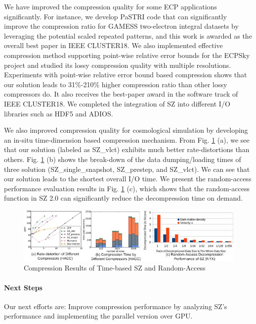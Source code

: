 We have improved the compression quality for some ECP applications significantly. For instance, we develop PaSTRI code that can significantly improve the compression ratio for GAMESS two-electron integral datasets by leveraging the potential scaled repeated patterns, and this work is awarded as the overall best paper in IEEE CLUSTER18. We also implemented effective compression method supporting point-wise relative error bounds for the ECPSky project and studied its lossy compression quality with multiple resolutions. Experiments with point-wise relative error bound based compression shows that our solution leads to 31\%-210\% higher compression ratio than other lossy compressors do. It also receives the best-paper award in the software track of IEEE CLUSTER18. We completed the integration of SZ into different I/O libraries such as HDF5 and ADIOS. 

We also improved compression quality for cosmological simulation by developing an in-situ time-dimension based compression mechanism. From Fig. \ref{fig:szcompression} (a), we see that our solution (labeled as SZ\_vlct) exhibits much better rate-distortions than others. Fig. \ref{fig:szcompression} (b) shows the break-down of the data dumping/loading times of three solution (SZ\_single\_snapshot, SZ\_prestep, and SZ\_vlct). We can see that our solution leads to the shortest overall I/O time. We present the random-access performance evaluation results in Fig. \ref{fig:szcompression} (c), which shows that the random-access function in SZ 2.0 can significantly reduce the decompression time on demand. 

\begin{figure}[htb]
\centering
\includegraphics[width=6in]{projects/2.3.4-DataViz/2.3.4.06-EZ/time-based-comp-and-random.jpg}
\vspace{-2mm}
\caption{Compression Results of Time-based SZ and Random-Access}
\label{fig:szcompression}
\vspace{-5mm}
\end{figure}

\paragraph{Next Steps} Our next efforts are: Improve compression performance by analyzing SZ's performance and implementing the parallel version over GPU.


